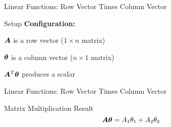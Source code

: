 \documentclass{beamer}
\begin{document}
\begin{frame}{Linear Functions: Row Vector Times Column Vector}
\begin{definitionbox}{Setup}
\textbf{Configuration:}
\cleanitemize
{
    \item $\bm{A}$ is a row vector ($1 \times n$ matrix)
    \item $\bm{\theta}$ is a column vector ($n \times 1$ matrix) 
    \item $\bm{A}^T\bm{\bm{\theta}}$ produces a scalar
}
\end{definitionbox}

\end{frame}

\begin{frame}{Linear Functions: Row Vector Times Column Vector}
\begin{keypointsbox}{Matrix Multiplication Result}
$$\bm{A}\bm{\theta} = A_{1}\theta_{1} + A_{2}\theta_{2}$$
\end{keypointsbox}

\end{frame}
\end{document}
